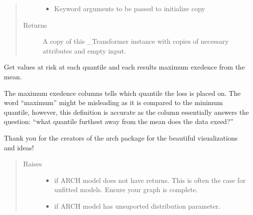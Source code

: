 \documentclass[letterpaper,10pt,english]{sphinxmanual}
\begin{document}
\begin{fulllineitems}
\begin{fulllineitems}
\begin{quote}
\begin{description}
\begin{itemize}
\item {} 
 \textendash{} Keyword arguments to be passed to initialize copy

\end{itemize}

\item[{Returns}] \leavevmode
A copy of this \_Transformer instance with copies of necessary
attributes and empty input.

\end{description}\end{quote}

\end{fulllineitems}


\begin{fulllineitems}
\label{\detokenize{dalio.pipe:dalio.pipe.ValueAtRisk.transform}}
Get values at risk at each quantile and each results maximum
exedence from the mean.

The maximum exedence columns tells which quantile the loss is placed
on. The word “maximum” might be misleading as it is compared to the
minimum quantile, however, this definition is accurate as the column
essentially answers the question: “what quantile furthest away from
the mean does the data exeed?”

Thank you for the creators of the arch package for the beautiful
visualizations and ideas!
\begin{quote}\begin{description}
\item[{Raises}] \leavevmode\begin{itemize}
\item {} 
 \textendash{} if ARCH model does not have returns. This is often
    the case for unfitted models. Ensure your graph is complete.

\item {} 
 \textendash{} if ARCH model has unsuported distribution parameter.

\end{itemize}

\end{description}\end{quote}

\end{fulllineitems}


\end{fulllineitems}
\end{document}
